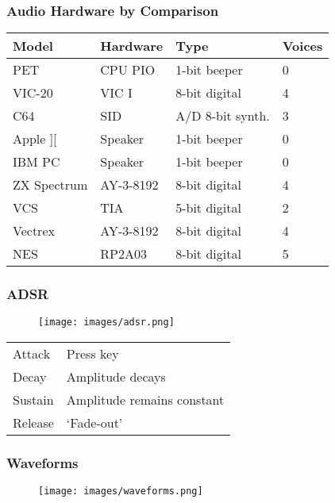 
\begin{frame}
\frametitle{Audio Hardware by Comparison}

\begin{tabular}{|l|l|l|l|}
\hline Model & Hardware & Type & Voices \\ \hline
PET & CPU PIO & 1-bit beeper & 0 \\
VIC-20 & VIC I & 8-bit digital & 4 \\
C64 & SID & A/D 8-bit synth. & 3 \\ \hline
Apple ][ & Speaker & 1-bit beeper & 0 \\
IBM PC & Speaker & 1-bit beeper & 0 \\
ZX Spectrum & AY-3-8192 & 8-bit digital & 4 \\ \hline
VCS & TIA & 5-bit digital & 2 \\
Vectrex & AY-3-8192 & 8-bit digital & 4 \\
NES & RP2A03 & 8-bit digital & 5 \\ \hline
\end{tabular}

\end{frame}


\begin{frame}
\frametitle{ADSR}

\begin{figure}
\texttt{[image: images/adsr.png]}
\end{figure}

\begin{tabular}{l|l}
Attack & Press key \\
Decay & Amplitude decays \\
Sustain & Amplitude remains constant \\
Release & `Fade-out' \\
\end{tabular}

\end{frame}


\begin{frame}
\frametitle{Waveforms}

\begin{figure}
\texttt{[image: images/waveforms.png]}
\end{figure}

\end{frame}

